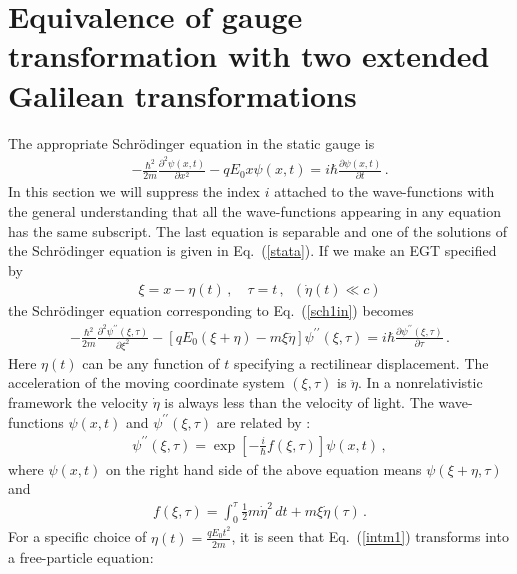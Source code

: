 \documentclass[12pt]{article}
\begin{document}
\section{Equivalence of gauge transformation with two extended 
Galilean transformations}
\label{qac}
The appropriate Schr\"{o}dinger equation in the static gauge is
%
\begin{eqnarray}
-\frac{\hbar^2}{2m}\frac{\partial^2 \psi(x,t)}{\partial x^2}
- qE_0x \psi(x,t)=i\hbar\frac{\partial \psi(x,t)}{\partial t}\,.
\label{sch1in}
\end{eqnarray}
%
In this section we will suppress the index $i$ attached to the wave-functions
with the general understanding that all the wave-functions appearing in any
equation has the same subscript. The last equation is separable and one of the
solutions of the Schr\"{o}dinger equation is given in Eq.~(\ref{stata}). If we
make an EGT specified by
%
\begin{eqnarray}
\xi = x - \eta(t)\,,\,\,\,\,\,\,\tau = t\,,\,
\,\,(\dot{\eta}(t)\ll c)
\label{noninc}
\end{eqnarray}
%
the Schr\"{o}dinger equation corresponding to Eq.~(\ref{sch1in}) becomes
%
\begin{eqnarray}
-\frac{\hbar^2}{2m}\frac{\partial^2 \psi^{\prime\prime}(\xi,\tau)}{\partial 
\xi^2} -\left[ qE_0(\xi + \eta) - m \xi \ddot{\eta}\right]
\psi^{\prime\prime}(\xi,\tau)=i\hbar\frac{\partial 
\psi^{\prime\prime}(\xi, \tau)}{\partial \tau}\,.
\label{intm1}
\end{eqnarray}
%
Here $\eta(t)$ can be any function of $t$ specifying a rectilinear
displacement. The acceleration of the moving coordinate system $(\xi,\tau)$ is
$\ddot{\eta}$. In a nonrelativistic framework the velocity $\dot{\eta}$ is
always less than the velocity of light. The wave-functions $\psi(x,t)$ and 
$\psi^{\prime\prime}(\xi, \tau)$ are related by \cite{rosen, holstein, paddy}:
%
\begin{eqnarray}
\psi^{\prime\prime}(\xi,\tau)=\exp\left[-\frac{i}{\hbar}f(\xi,\tau)\right]
\psi(x,t)\,,
\label{coor_gauge1} 
\end{eqnarray}
%
where $\psi(x,t)$ on the right hand side of the above equation means
$\psi(\xi+\eta, \tau)$ and 
%
\begin{eqnarray}
f(\xi, \tau)=\int_0^\tau
\frac12 m\dot{\eta}^2\,dt + m\xi \dot{\eta}(\tau)\,.
\label{f}
\end{eqnarray}
%
For a specific choice of $\eta(t)=\frac{qE_0t^2}{2m}$, it is seen that 
Eq.~(\ref{intm1}) transforms into a free-particle equation: 
\end{document}
